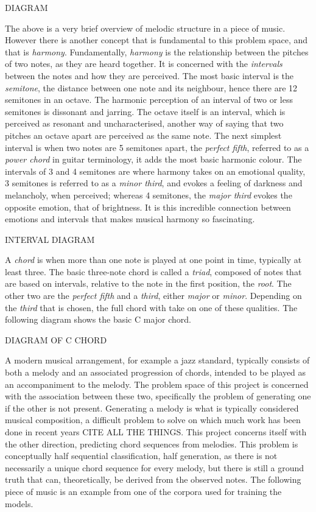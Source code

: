 \documentclass[bsc,singlespacing,logo, parskip, deptreport]{infthesis}
\begin{document}
DIAGRAM

The above is a very brief overview of melodic structure in a piece of music. However there is another concept that is fundamental to this problem space, and that is {\em harmony}. Fundamentally, {\em harmony} is the relationship between the pitches of two notes, as they are heard together. It is concerned with the {\em intervals} between the notes and how they are perceived. The most basic interval is the {\em semitone}, the distance between one note and its neighbour, hence there are 12 semitones in an octave. The harmonic perception of an interval of two or less semitones is dissonant and jarring. The octave itself is an interval, which is perceived as resonant and uncharacterised, another way of saying that two pitches an octave apart are perceived as the same note. The next simplest interval is when two notes are 5 semitones apart, the {\em perfect fifth}, referred to as a {\em power chord} in guitar terminology, it adds the most basic harmonic colour. The intervals of 3 and 4 semitones are where harmony takes on an emotional quality, 3 semitones is referred to as a {\em minor third}, and evokes a feeling of darkness and melancholy, when perceived; whereas 4 semitones, the {\em major third} evokes the opposite emotion, that of brightness. It is this incredible connection between emotions and intervals that makes musical harmony so fascinating.

INTERVAL DIAGRAM

A {\em chord} is when more than one note is played at one point in time, typically at least three. The basic three-note chord is called a {\em triad}, composed of notes that are based on intervals, relative to the note in the first position, the {\em root}. The other two are the {\em perfect fifth} and a {\em third}, either {\em major} or {\em minor}. Depending on the {\em third} that is chosen, the full chord with take on one of these qualities. The following diagram shows the basic C major chord.

DIAGRAM OF C CHORD

A modern musical arrangement, for example a jazz standard, typically consists of both a melody and an associated progression of chords, intended to be played as an accompaniment to the melody. The problem space of this project is concerned with the association between these two, specifically the problem of generating one if the other is not present. Generating a melody is what is typically considered musical composition, a difficult problem to solve on which much work has been done in recent years CITE ALL THE THINGS. This project concerns itself with the other direction, predicting chord sequences from melodies. This problem is conceptually half sequential classification, half generation, as there is not necessarily a unique chord sequence for every melody, but there is still a ground truth that can, theoretically, be derived from the observed notes. The following piece of music is an example from one of the corpora used for training the models.
\end{document}
